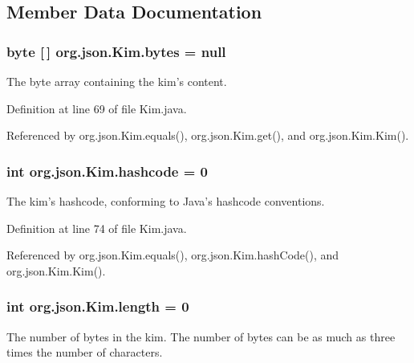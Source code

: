 \subsection{Member Data Documentation}
\hypertarget{classorg_1_1json_1_1_kim_aca37e9b2f118afc91bc8d1f37512819b}{
\subsubsection[{bytes}]{\setlength{\rightskip}{0pt plus 5cm}byte \mbox{[}$\,$\mbox{]} org.\-json.\-Kim.\-bytes = null\hspace{0.3cm}{\ttfamily [private]}}}\label{classorg_1_1json_1_1_kim_aca37e9b2f118afc91bc8d1f37512819b}
The byte array containing the kim's content. 

Definition at line 69 of file Kim.\-java.



Referenced by org.\-json.\-Kim.\-equals(), org.\-json.\-Kim.\-get(), and org.\-json.\-Kim.\-Kim().

\hypertarget{classorg_1_1json_1_1_kim_aab8a2339df2bbc09510350775572ecf2}{
\subsubsection[{hashcode}]{\setlength{\rightskip}{0pt plus 5cm}int org.\-json.\-Kim.\-hashcode = 0\hspace{0.3cm}{\ttfamily [private]}}}\label{classorg_1_1json_1_1_kim_aab8a2339df2bbc09510350775572ecf2}
The kim's hashcode, conforming to Java's hashcode conventions. 

Definition at line 74 of file Kim.\-java.



Referenced by org.\-json.\-Kim.\-equals(), org.\-json.\-Kim.\-hash\-Code(), and org.\-json.\-Kim.\-Kim().

\hypertarget{classorg_1_1json_1_1_kim_a6caa186b493021e083e4efbf734e3a40}{
\subsubsection[{length}]{\setlength{\rightskip}{0pt plus 5cm}int org.\-json.\-Kim.\-length = 0}}\label{classorg_1_1json_1_1_kim_a6caa186b493021e083e4efbf734e3a40}
The number of bytes in the kim. The number of bytes can be as much as three times the number of characters. 

